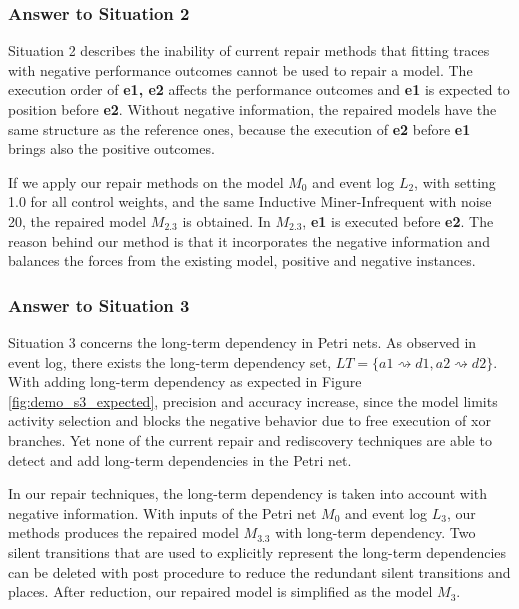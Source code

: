 \subsubsection{Answer to Situation 2}
Situation 2 describes the inability of current repair methods that fitting traces with negative performance outcomes cannot be used to repair a model. 
The execution order of \textbf{e1, e2} affects the performance outcomes and \textbf{e1} is expected to position before \textbf{e2}. Without negative information, the repaired models have the same structure as the reference ones, because the execution of \textbf{e2} before \textbf{e1} brings also the positive outcomes. 

If we apply our repair methods on the model $M_0$ and event log $L_2$, with setting 1.0 for all control weights, and the same Inductive Miner-Infrequent with noise 20, the repaired model $M_{2.3}$ is obtained. In $M_{2.3}$, \textbf{e1} is executed before \textbf{e2}. The reason behind our method is that it incorporates the negative information and balances the forces from the existing model, positive and negative instances. 

\subsubsection{Answer to Situation 3}
Situation 3 concerns the long-term dependency in Petri nets. As observed in event log, there exists the long-term dependency set, $LT=\{ a1\rightsquigarrow d1, a2\rightsquigarrow d2\}$.  With adding long-term dependency as expected in Figure \ref{fig:demo_s3_expected}, precision and accuracy increase, since the model limits activity selection and blocks the negative behavior due to free execution of xor branches. Yet none of the current repair  and rediscovery techniques are able to detect and add long-term dependencies in the Petri net. 

In our repair techniques, the long-term dependency is taken into account with negative information. With inputs of the Petri net $M_0$ and event log $L_3$, our methods produces the repaired model $M_{3.3}$ with long-term dependency. Two silent transitions that are used to explicitly represent the long-term dependencies can be deleted with post procedure to reduce the redundant silent transitions and places. After reduction, our repaired model is simplified as the model $M_{3}$. 

